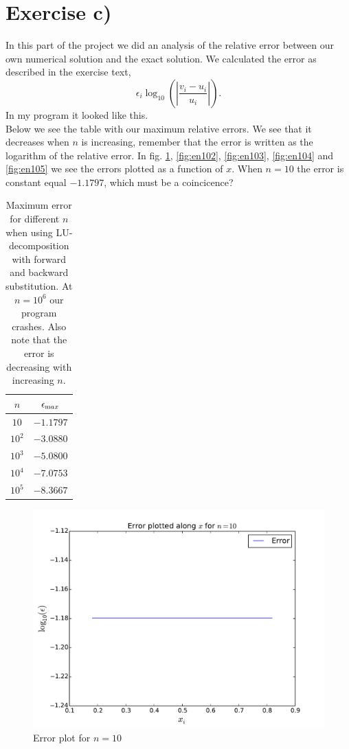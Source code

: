 \documentclass[english, 11pt]{article}
\begin{document}
\section*{Exercise c)} In this part of the project we did an analysis of the relative error between our own numerical solution and the exact solution. We calculated the error as described in the exercise text,
$$ \epsilon_i \log_{10} \left( \left| \frac{v_i - u_i}{u_i} \right|  \right). $$
In my program it looked like this.\\



Below we see the table with our maximum relative errors. We see that it decreases when $n$ is increasing, remember that the error is written as the logarithm of the relative error. In fig. \ref{fig:en101}, \ref{fig:en102}, \ref{fig:en103}, \ref{fig:en104} and \ref{fig:en105} we see the errors plotted as a function of $x$. When $n=10$ the error is constant equal $-1.1797$, which must be a coincicence?

\begin{table}[H]
  \centering
  \begin{tabular}{ c c }
    \toprule
    $n$ & $\epsilon_{\text max}$ \\
    \midrule
	$10$ &	$-1.1797$ \\
	$10^2$ & $-3.0880$ \\
	$10^3$ & $-5.0800$ \\
	$10^4$ & $-7.0753$ \\
	$10^5$ & $-8.3667$ \\
    \bottomrule
  \end{tabular}
  \caption{Maximum error for different $n$ when using LU-decomposition with forward and backward substitution. At $n=10^6$ our program crashes. Also note that the error is decreasing with increasing $n$.}
  \label{tab:error_max}
\end{table}

\begin{figure}[H]
    \centering
    \includegraphics[width = .9\textwidth]{error_n_10.pdf}
    \caption{Error plot for $n=10$}
    \label{fig:en101}
\end{figure}
\end{document}
